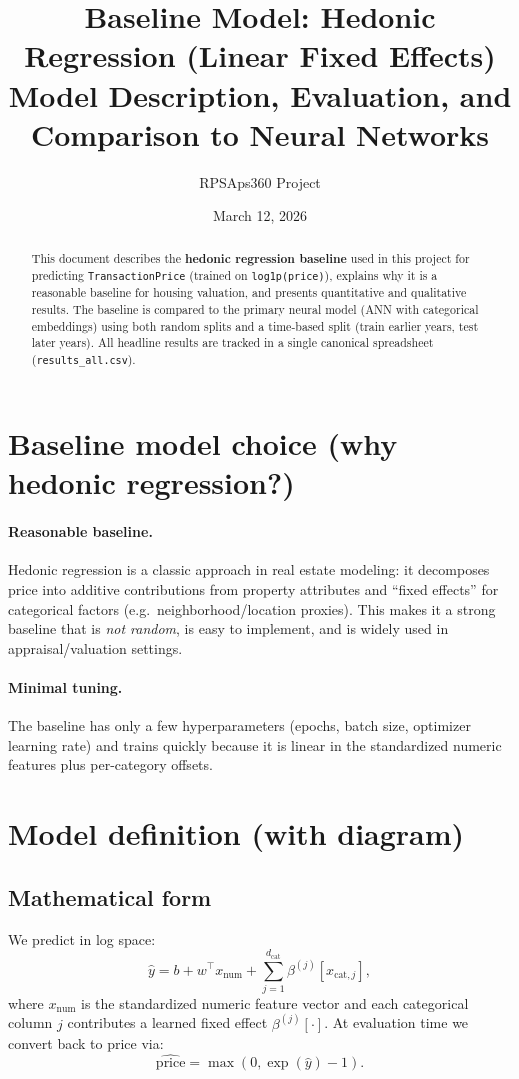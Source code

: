 \documentclass[11pt]{article}
\title{Baseline Model: Hedonic Regression (Linear Fixed Effects)\\
\large Model Description, Evaluation, and Comparison to Neural Networks}
\author{RPSAps360 Project}
\date{March 12, 2026}
\begin{document}
\maketitle

\begin{abstract}
This document describes the \textbf{hedonic regression baseline} used in this project for predicting \texttt{TransactionPrice} (trained on \texttt{log1p(price)}), explains why it is a reasonable baseline for housing valuation, and presents quantitative and qualitative results. The baseline is compared to the primary neural model (ANN with categorical embeddings) using both random splits and a time-based split (train earlier years, test later years). All headline results are tracked in a single canonical spreadsheet (\texttt{results\_all.csv}).
\end{abstract}

\tableofcontents
\newpage

\section{Baseline model choice (why hedonic regression?)}
\paragraph{Reasonable baseline.}
Hedonic regression is a classic approach in real estate modeling: it decomposes price into additive contributions from property attributes and ``fixed effects'' for categorical factors (e.g.\ neighborhood/location proxies). This makes it a strong baseline that is \emph{not random}, is easy to implement, and is widely used in appraisal/valuation settings.

\paragraph{Minimal tuning.}
The baseline has only a few hyperparameters (epochs, batch size, optimizer learning rate) and trains quickly because it is linear in the standardized numeric features plus per-category offsets.

\section{Model definition (with diagram)}
\subsection{Mathematical form}
We predict in log space:
\[
  \hat{y} = b + w^\top x_{\text{num}} + \sum_{j=1}^{d_{\text{cat}}} \beta^{(j)}[x_{\text{cat},j}],
\]
where \(x_{\text{num}}\) is the standardized numeric feature vector and each categorical column \(j\) contributes a learned fixed effect \(\beta^{(j)}[\cdot]\). At evaluation time we convert back to price via:
\[
  \widehat{\text{price}} = \max(0, \exp(\hat{y}) - 1).
\]
\end{document}
